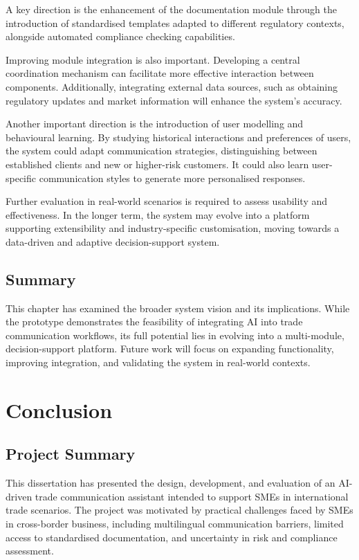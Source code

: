 \documentclass[12pt,a4paper]{report}
\begin{document}
A key direction is the enhancement of the documentation module through the introduction of standardised templates adapted to different regulatory contexts, alongside automated compliance checking capabilities.

Improving module integration is also important. Developing a central coordination mechanism can facilitate more effective interaction between components. Additionally, integrating external data sources, such as obtaining regulatory updates and market information will enhance the system's accuracy.

Another important direction is the introduction of user modelling and behavioural learning. By studying historical interactions and preferences of users, the system could adapt communication strategies, distinguishing between established clients and new or higher-risk customers. It could also learn user-specific communication styles to generate more personalised responses.

Further evaluation in real-world scenarios is required to assess usability and effectiveness. In the longer term, the system may evolve into a platform supporting extensibility and industry-specific customisation, moving towards a data-driven and adaptive decision-support system.

\section{Summary}

This chapter has examined the broader system vision and its implications. While the prototype demonstrates the feasibility of integrating AI into trade communication workflows, its full potential lies in evolving into a multi-module, decision-support platform. Future work will focus on expanding functionality, improving integration, and validating the system in real-world contexts.

\chapter{Conclusion}

\section{Project Summary}

This dissertation has presented the design, development, and evaluation of an AI-driven trade communication assistant intended to support SMEs in international trade scenarios. The project was motivated by practical challenges faced by SMEs in cross-border business, including multilingual communication barriers, limited access to standardised documentation, and uncertainty in risk and compliance assessment.
\end{document}
